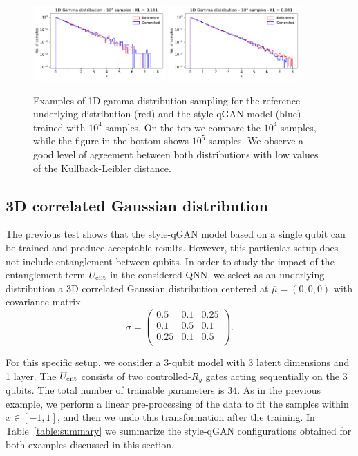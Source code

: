 \documentclass[twocolumn,preprintnumbers,superscriptaddress]{revtex4-2}
\begin{document}
\begin{figure}
  \includegraphics[width=0.45\textwidth]{plots/1Dgamma/1Dgamma_distribution_10k.pdf}
  \includegraphics[width=0.45\textwidth]{plots/1Dgamma/1Dgamma_distribution_100k.pdf}
  \caption{\label{fig:gamma} Examples of 1D gamma distribution sampling for the
  reference underlying distribution (red) and the style-qGAN model (blue) trained with
  $10^4$ samples. On the top we compare the $10^4$ samples, while the figure in
  the bottom shows $10^5$ samples. We observe a good level of agreement between
  both distributions with low values of the Kullback-Leibler distance.}
\end{figure}

\subsection{3D correlated Gaussian distribution}

The previous test shows that the style-qGAN model based on a single qubit can be
trained and produce acceptable results. However, this particular setup does not
include entanglement between qubits. In order to study the impact of the
entanglement term $U_{\rm ent}$ in the considered QNN, we select as an
underlying distribution a 3D correlated Gaussian distribution centered at
$\overline{\mu}=(0,0,0)$ with covariance matrix
\begin{equation}
  \sigma =
\begin{pmatrix}
  0.5 & 0.1 & 0.25\\
  0.1 & 0.5 & 0.1\\
  0.25 & 0.1 & 0.5\\
  \end{pmatrix}.
\end{equation}

For this specific setup, we consider a 3-qubit model with 3 latent dimensions and
1 layer. The $U_{\rm ent}$ consists of two controlled-$R_{y}$ gates acting sequentially on the 3 qubits.
The total number of trainable parameters is 34. As in the previous example, we perform a linear pre-processing of the data to fit the samples within $x \in [-1, 1]$, and then we undo this transformation after the training. In Table~\ref{table:summary}
we summarize the style-qGAN configurations obtained for both examples discussed in
this section.
\end{document}
